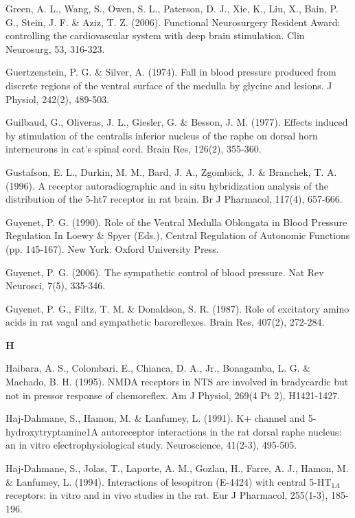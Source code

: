 \documentclass[a4paper,12pt,twoside]{report}
\begin{document}
\begin{singlespacing}
\begin{footnotesize}
Green, A. L., Wang, S., Owen, S. L., Paterson, D. J., Xie, K., Liu, X., Bain, P. G., Stein, J. F. \& Aziz, T. Z. (2006). Functional Neurosurgery Resident Award: controlling the cardiovascular system with deep brain stimulation. Clin Neurosurg, 53, 316-323.

Guertzenstein, P. G. \& Silver, A. (1974). Fall in blood pressure produced from discrete regions of the ventral surface of the medulla by glycine and lesions. J Physiol, 242(2), 489-503.

Guilbaud, G., Oliveras, J. L., Giesler, G. \& Besson, J. M. (1977). Effects induced by stimulation of the centralis inferior nucleus of the raphe on dorsal horn interneurons in cat's spinal cord. Brain Res, 126(2), 355-360.

Gustafson, E. L., Durkin, M. M., Bard, J. A., Zgombick, J. \& Branchek, T. A. (1996). A receptor autoradiographic and in situ hybridization analysis of the distribution of the 5-ht7 receptor in rat brain. Br J Pharmacol, 117(4), 657-666.

Guyenet, P. G. (1990). Role of the Ventral Medulla Oblongata in Blood Pressure Regulation In Loewy \& Spyer (Eds.), Central Regulation of Autonomic Functions (pp. 145-167). New York: Oxford University Press.

Guyenet, P. G. (2006). The sympathetic control of blood pressure. Nat Rev Neurosci, 7(5), 335-346.

Guyenet, P. G., Filtz, T. M. \& Donaldson, S. R. (1987). Role of excitatory amino acids in rat vagal and sympathetic baroreflexes. Brain Res, 407(2), 272-284.

\medskip
\begin{Large}\textbf{H}\end{Large}

Haibara, A. S., Colombari, E., Chianca, D. A., Jr., Bonagamba, L. G. \& Machado, B. H. (1995). NMDA receptors in NTS are involved in bradycardic but not in pressor response of chemoreflex. Am J Physiol, 269(4 Pt 2), H1421-1427.

Haj-Dahmane, S., Hamon, M. \& Lanfumey, L. (1991). K+ channel and 5-hydroxytryptamine1A autoreceptor interactions in the rat dorsal raphe nucleus: an in vitro electrophysiological study. Neuroscience, 41(2-3), 495-505.

Haj-Dahmane, S., Jolas, T., Laporte, A. M., Gozlan, H., Farre, A. J., Hamon, M. \& Lanfumey, L. (1994). Interactions of lesopitron (E-4424) with central 5-HT$_{1A}$ receptors: in vitro and in vivo studies in the rat. Eur J Pharmacol, 255(1-3), 185-196.


\end{footnotesize}
\end{singlespacing}
\end{document}
